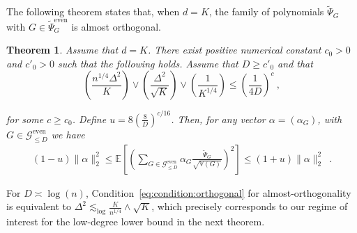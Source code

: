 \documentclass{article}
\newcommand{\alex}[1]{\textcolor{magenta}{[alex: #1]}}
\newcommand{\nico}[1]{\textcolor{magenta}{[Nicolas: #1]}}
\newtheorem{theorem}{Theorem}
\begin{document}
The following theorem states that, when $d=K$, the family of polynomials $\widetilde{\Psi}_{G}$ with $G\in \widetilde{\Psi}^{\mathrm{even}}_{G}$ is  almost orthogonal.
    \begin{theorem}\label{thm:Riez_constant}
        Assume that $d=K$. There exist positive numerical constant $c_0>0$ and $c'_0>0$ such that the following holds. 
        Assume that $D\geq c'_0$ and that 
        \begin{equation}    \label{eq:condition:orthogonal}
        \left(\frac{n^{1/4}\Delta^2}{K}\right)\vee \left(\frac{\Delta^2}{\sqrt{K}}\right)\vee \left(\frac{1}{K^{1/4}}\right)\leq  \left(\frac{1}{4D}\right)^{c}\ , 
        \end{equation}
        
        for some $c\geq c_0$. Define $u =  8 \left(\frac{8}{D}\right)^{c/16}$. Then, for any vector $\alpha=(\alpha_G)$, with $G\in \mathcal{G}_{\leq D}^{\mathrm{even}}$  we have 
        \begin{align}\label{eq:norm}
            (1-u) \|\alpha\|_2^2 \leq \mathbb{E}\left[\left(\sum_{G\in \mathcal{G}_{\leq D}^{\mathrm{even}}} \alpha_G \frac{\widetilde{\Psi}_G}{\sqrt{\mathbb V(G) }}\right)^2\right] \leq (1+u) \|\alpha\|_2^2\enspace .
        \end{align} 
        \end{theorem}

For $D\asymp \log(n)$, Condition~\eqref{eq:condition:orthogonal} for almost-orthogonality is equivalent to  $\Delta^2 \lesssim_{\log} \frac{K}{n^{1/4}}\wedge  \sqrt{K}$, which precisely corresponds to our regime of interest for the low-degree lower bound in the next theorem. 

        \medskip 
\end{document}
